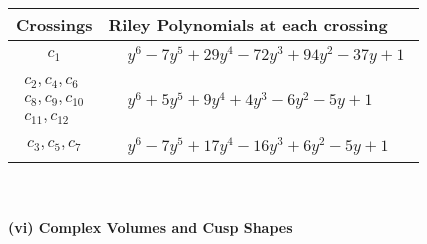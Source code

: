\documentclass[1p]{elsarticle_modified}
\theoremstyle{definition}
\begin{document}
\begin{tabular}{m{50pt}|m{274pt}}
Crossings & \hspace{64pt}Riley Polynomials at each crossing \\
\hline $$\begin{aligned}c_{1}\end{aligned}$$&$\begin{aligned}
&y^6-7 y^5+29 y^4-72 y^3+94 y^2-37 y+1
\end{aligned}$\\
\hline $$\begin{aligned}c_{2},c_{4},c_{6}\\c_{8},c_{9},c_{10}\\c_{11},c_{12}\end{aligned}$$&$\begin{aligned}
&y^6+5 y^5+9 y^4+4 y^3-6 y^2-5 y+1
\end{aligned}$\\
\hline $$\begin{aligned}c_{3},c_{5},c_{7}\end{aligned}$$&$\begin{aligned}
&y^6-7 y^5+17 y^4-16 y^3+6 y^2-5 y+1
\end{aligned}$\\
\hline
\end{tabular}\\~\\
\newpage\flushleft \textbf{(vi) Complex Volumes and Cusp Shapes}
\end{document}
